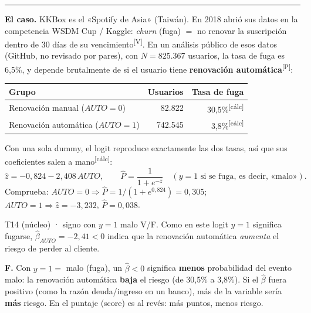 \documentclass[10pt,a4paper]{article}
\newcommand{\V}{\textsuperscript{\textcolor{green!45!black}{[V]}}}
\newcommand{\Pre}{\textsuperscript{\textcolor{orange!80!black}{[P]}}}
\newcommand{\calc}{\textsuperscript{\textcolor{blue!60!black}{[cálc]}}}
\newcommand{\acto}[1]{\vspace{6pt}{\large\bfseries #1}\par\vspace{2pt}\hrule\vspace{4pt}}
\newcommand{\Ph}{\hat P}
\begin{document}
\acto{Acto 1. ¿Quién se va de la plataforma? Logit y MPL con la fuga de KKBox}

\textbf{El caso.} KKBox es el «Spotify de Asia» (Taiwán). En 2018 abrió sus datos en la competencia WSDM Cup / Kaggle: \emph{churn} (fuga) $=$ no renovar la suscripción dentro de 30 días de su vencimiento\V. En un análisis público de esos datos (GitHub, no revisado por pares), con $N=825.367$ usuarios, la tasa de fuga es 6,5\%, y depende brutalmente de si el usuario tiene \textbf{renovación automática}\Pre:
\begin{center}\small
\begin{tabular}{lrr}\toprule
Grupo & Usuarios & Tasa de fuga\\\midrule
Renovación manual ($AUTO=0$) & 82.822 & 30,5\%\calc\\
Renovación automática ($AUTO=1$) & 742.545 & 3,8\%\calc\\\bottomrule
\end{tabular}
\end{center}
Con una sola dummy, el logit reproduce exactamente las dos tasas, así que sus coeficientes salen a mano\calc:
\[
\hat z=-0{,}824-2{,}408\,AUTO,\qquad \Ph=\frac{1}{1+e^{-\hat z}}\quad (y=1 \text{ si se fuga, es decir, «malo»}).
\]
Comprueba: $AUTO=0\Rightarrow \Ph=1/(1+e^{0,824})=0{,}305$; \ $AUTO=1\Rightarrow \hat z=-3{,}232$, $\Ph=0{,}038$.

\begin{enun}{T14 (núcleo) · signo con $y=1$ malo}
V/F. Como en este logit $y=1$ significa fugarse, $\hat\beta_{AUTO}=-2{,}41<0$ indica que la renovación automática \emph{aumenta} el riesgo de perder al cliente.
\end{enun}
\begin{ejemplar}
\textbf{F.} Con $y=1=$ malo (fuga), un $\hat\beta<0$ significa \textbf{menos} probabilidad del evento malo: la renovación automática \textbf{baja} el riesgo (de 30,5\% a 3,8\%). Si el $\hat\beta$ fuera positivo (como la razón deuda/ingreso en un banco), más de la variable sería \textbf{más} riesgo. En el puntaje (score) es al revés: más puntos, menos riesgo.
\end{ejemplar}
\end{document}
